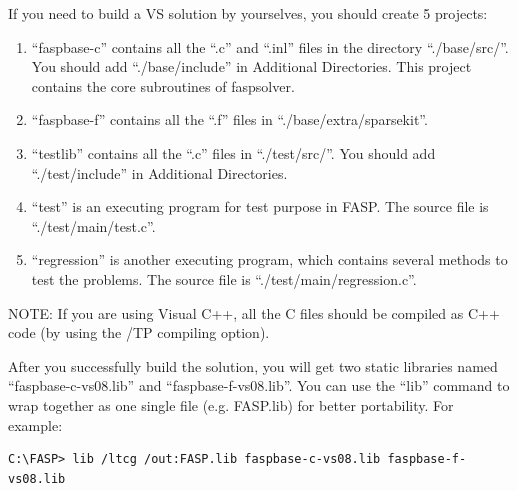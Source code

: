 \documentclass[11pt]{memoir}
\begin{document}
If you need to build a VS solution by yourselves, you should create 5 projects:
\begin{enumerate}
\item ``faspbase-c'' contains all the ``.c'' and ``.inl'' files in the directory ``./base/src/''. You should add ``./base/include'' in Additional Directories. This project contains the core subroutines of faspsolver. 
\item ``faspbase-f'' contains all the ``.f'' files in ``./base/extra/sparsekit''. 
\item ``testlib'' contains all the ``.c'' files in ``./test/src/''. You should add ``./test/include'' in Additional Directories.
\item ``test'' is an executing program for test purpose in FASP. The source file is ``./test/main/test.c''.
\item ``regression'' is another executing program, which contains several methods to test the problems. The source file is ``./test/main/regression.c''.
\end{enumerate}

\begin{snugshade}\noindent
NOTE: If you are using Visual C++, all the C files should be compiled as C++ code (by using the /TP compiling option).
\end{snugshade}

After you successfully build the solution, you will get two static libraries named ``faspbase-c-vs08.lib'' and ``faspbase-f-vs08.lib''. You can use the ``lib'' command to wrap together as one single file (e.g. FASP.lib) for better portability. For example:
%
\begin{lstlisting}[numbers=none]
C:\FASP> lib /ltcg /out:FASP.lib faspbase-c-vs08.lib faspbase-f-vs08.lib
\end{lstlisting}
%
\end{document}
